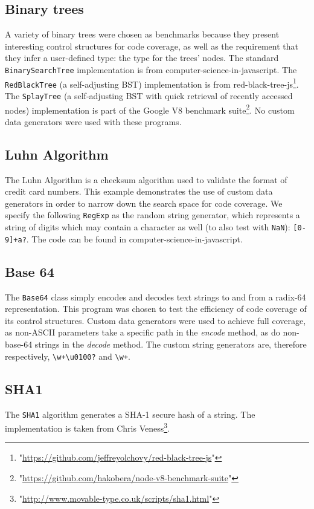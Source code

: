 \subsection{Binary trees}
A variety of binary trees were chosen as benchmarks because they present interesting control structures for code coverage, as well as the requirement that they infer a user-defined type: the type for the trees' nodes. The standard \texttt{BinarySearchTree} implementation is from \textsf{computer-science-in-javascript}\footnotemark[2]. The \texttt{RedBlackTree} (a self-adjusting BST) implementation is from \textsf{red-black-tree-js}\footnote{"\url{https://github.com/jeffreyolchovy/red-black-tree-js}"}. The \texttt{SplayTree} (a self-adjusting BST with quick retrieval of recently accessed nodes) implementation is part of the Google V8 benchmark suite\footnote{"\url{https://github.com/hakobera/node-v8-benchmark-suite}"}. No custom data generators were used with these programs.

\subsection{Luhn Algorithm}
The Luhn Algorithm is a checksum algorithm used to validate the format of credit card numbers. This example demonstrates the use of custom data generators in order to narrow down the search space for code coverage. We specify the following \texttt{RegExp} as the random string generator, which represents a string of digits which may contain a character as well (to also test with \texttt{NaN}): \texttt{[0-9]+a?}. The code can be found in \textsf{computer-science-in-javascript}\footnotemark[2].

\subsection{Base 64}
The \texttt{Base64} class simply encodes and decodes text strings to and from a radix-64 representation. This program was chosen to test the efficiency of code coverage of its control structures. Custom data generators were used to achieve full coverage, as non-ASCII parameters take a specific path in the \emph{encode} method, as do non-base-64 strings in the \emph{decode} method. The custom string generators are, therefore respectively, \texttt{\textbackslash w+\textbackslash u0100?} and \texttt{\textbackslash w+}.

\subsection{SHA1}
The \texttt{SHA1} algorithm generates a SHA-1 secure hash of a string. The implementation is taken from Chris Veness\footnote{"\url{http://www.movable-type.co.uk/scripts/sha1.html}"}.


